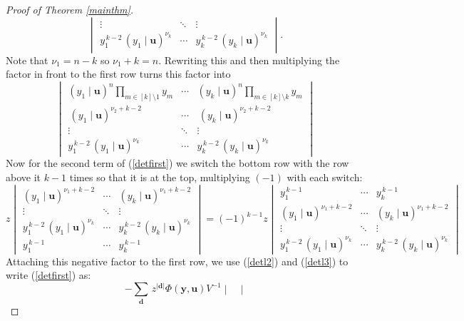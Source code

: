 \documentclass[12pt]{article}
\theoremstyle{plain}
\theoremstyle{definition}
\newcommand{\db}{\boldsymbol{d}}
\newcommand{\ub}{\boldsymbol{u}}
\begin{document}
\begin{proof}[Proof of Theorem \ref{mainthm}]
\begin{equation*}
\begin{vmatrix}
\vdots & \ddots & \vdots \\
y_1^{\,k-2}\,(y_1\!\mid\!\ub)^{\nu_k} &  \cdots & y_k^{\,k-2}\,(y_k\!\mid\!\ub)^{\nu_k} 
\end{vmatrix}.
\end{equation*}
Note that $\nu_1=n-k$ so $\nu_1+k=n$. Rewriting this and then multiplying the factor in front to the first row turns this factor into
\begin{equation} \label{detl2}
\begin{vmatrix}
(y_1\!\mid\!\ub)^{n}\prod_{m\in [k]\setminus {1}} y_m  &  \cdots &(y_k\!\mid\!\ub)^{n}  \prod_{m\in [k]\setminus {k}}y_m \\[6pt]
\,(y_1\!\mid\!\ub)^{\nu_2 + k - 2} &  \cdots & \,(y_k\!\mid\!\ub)^{\nu_2 + k - 2} \\
\vdots & \ddots & \vdots \\
y_1^{\,k-2}\,(y_1\!\mid\!\ub)^{\nu_k} &  \cdots & y_k^{\,k-2}\,(y_k\!\mid\!\ub)^{\nu_k} 
\end{vmatrix}
\end{equation}
Now for the second term of (\ref{detfirst}) we switch the bottom row with the row above it $k-1$ times so that it is at the top, multiplying $(-1)$ with each switch:
\begin{equation}\label{detl3}
    z\begin{vmatrix}
(y_1\!\mid\!\ub)^{\nu_1 + k - 2} &  \cdots & (y_k\!\mid\!\ub)^{\nu_1 + k - 2} \\
\vdots  & \ddots &\vdots\\
y_1^{\,k-2}\,(y_1\!\mid\!\ub)^{\nu_k} &  \cdots & y_k^{\,k-2}\,(y_k\!\mid\!\ub)^{\nu_k} \\[6pt]
y_1^{\,k-1} &  \cdots & y_k^{\,k-1}
\end{vmatrix}=(-1)^{k-1}z\begin{vmatrix}
y_1^{\,k-1} &  \cdots & y_k^{\,k-1}\\
(y_1\!\mid\!\ub)^{\nu_1 + k - 2} &  \cdots & (y_k\!\mid\!\ub)^{\nu_1 + k - 2} \\
\vdots  & \ddots &\vdots\\
y_1^{\,k-2}\,(y_1\!\mid\!\ub)^{\nu_k} &  \cdots & y_k^{\,k-2}\,(y_k\!\mid\!\ub)^{\nu_k} 
\end{vmatrix}
\end{equation}
Attaching this negative factor to the first row, we use (\ref{detl2}) and (\ref{detl3}) to write (\ref{detfirst}) as:
\begin{equation}\label{combinedps}
    -\sum_{\boldsymbol{d}} \, z^{|\db|}\Phi(\boldsymbol{y},\ub) V^{-1}\begin{vmatrix}

\end{vmatrix}
\end{equation}
\end{proof}
\end{document}
